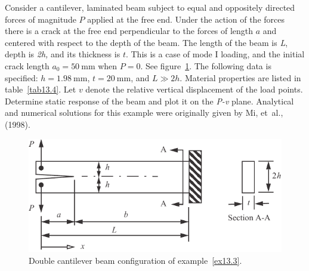 \documentclass{AeroStructure-ERJohnson}
\begin{document}
\begin{example*}\label{ex13.3}Consider a cantilever, laminated beam subject to equal and oppositely directed forces of magnitude $P$ applied at the free end. Under the action of the forces there is a crack at the free end perpendicular to the forces of length $a$ and centered with respect to the depth of the beam. The length of the beam is \textit{L}, depth is \textit{2h,} and its thickness is $t$. This is a case of mode I loading, and the initial crack length $a_{0}=50 \mathrm{~mm}$ when $P=0$. See figure~\ref{fig13.15}. The following data is specified: $h=1.98 \mathrm{~mm}$, $t=20 \mathrm{~mm}$, and $L \gg 2 h$. Material properties are listed in table~\ref{tab13.4}. Let $v$ denote the relative vertical displacement of the load points. Determine static response of the beam and plot it on the \textit{P-v} plane. Analytical and numerical solutions for this example were originally given by Mi, et~al., (1998).

\begin{figure}[!h]
\centerline{\includegraphics{Figure_13-15.pdf}}
\caption{Double cantilever beam configuration of example~\ref{ex13.3}.}\label{fig13.15}
\vspace*{-0.4pc}
\end{figure}


\end{example*}
\end{document}

